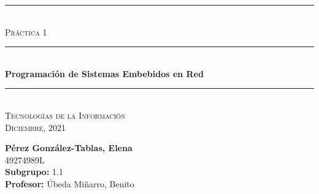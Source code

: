 \begin{titlepage}
	\begin{center}
		\rule{15cm}{0pt} \\
		[3cm]
		\textsc{\Large Práctica 1} \\
		\rule{15cm}{1pt} \\
		[0.25cm]
		\huge{\bfseries Programación de Sistemas Embebidos en Red} \\
		\rule{15cm}{1pt} \\
		\textsc{\Large Tecnologías de la Información} \\
		[0.25cm]
		\textsc{\Large Diciembre, 2021}\\
		[9cm]
	\end{center}
	\begin{flushright}
		\textbf{Pérez González-Tablas, Elena} \\
		[0.25cm]
		49274989L \\
		[0.25cm]
		\textbf{Subgrupo:} 1.1 \\
		[0.25cm]
		\textbf{Profesor:} Úbeda Miñarro, Benito\\
	\end{flushright}
\end{titlepage}
\newpage
\begin{titlepage}
	\begin{flushleft}
	\end{flushleft}
\end{titlepage}